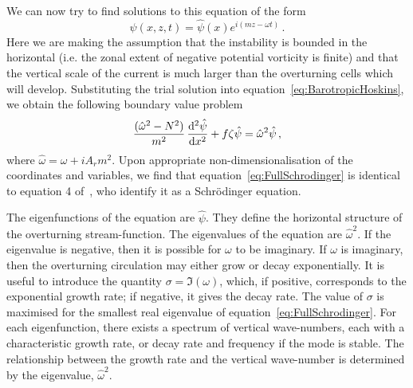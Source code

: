 We can now try to find solutions to this equation of the form
\begin{equation}
    \psi(x, z, t) = \hat{\psi}(x)e^{i(mz - \omega t)} \,.
\end{equation}
Here we are making the assumption that the instability is bounded in the horizontal (i.e. the zonal extent of negative potential vorticity is finite) and that the vertical scale of the current is much larger than the overturning cells which will develop. Substituting the trial solution into equation~\ref{eq:BarotropicHoskins}, we obtain the following boundary value problem
\begin{equation}
    \frac{(\hat{\omega}^2 - N^2 )}{m^2}\, \dv[2]{\hat{\psi}}{x} + f \zeta \hat{\psi} = \hat{\omega}^2 \hat{\psi}\, ,
    \label{eq:FullSchrodinger}
\end{equation}
where $\hat{\omega} = \omega + i A_r m^2$. Upon appropriate non-dimensionalisation of the coordinates and variables, we find that equation~\ref{eq:FullSchrodinger} is identical to equation 4 of~\citet{Plougonven2009}, who identify it as a Schr\"odinger equation.

The eigenfunctions of the equation are $\hat{\psi}$. They define the horizontal structure of the overturning stream-function. The eigenvalues of the equation are $\hat{\omega}^2$. If the eigenvalue is negative, then it is possible for $\omega$ to be imaginary. If $\omega$ is imaginary, then the overturning circulation may either grow or decay exponentially. It is useful to introduce the quantity $\sigma = \Im(\omega)$, which, if positive, corresponds to the exponential growth rate; if negative, it gives the decay rate. The value of $\sigma$ is maximised for the smallest real eigenvalue of equation~\ref{eq:FullSchrodinger}. For each eigenfunction, there exists a spectrum of vertical wave-numbers, each with a characteristic growth rate, or decay rate and frequency if the mode is stable\footnotemark. The relationship between the growth rate and the vertical wave-number is determined by the eigenvalue, $\hat{\omega}^2$.


